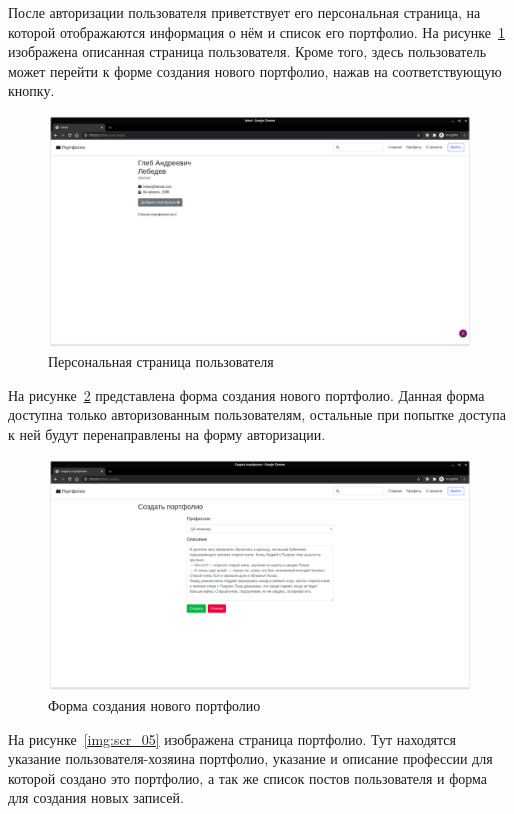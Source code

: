 После авторизации пользователя приветствует его персональная страница, на которой отображаются информация о нём и список его портфолио. На рисунке~\ref{img:scr_03} изображена описанная страница пользователя. Кроме того, здесь пользователь может перейти к форме создания нового портфолио, нажав на соответствующую кнопку.

\begin{figure}[H]
    \centering
    \includegraphics[scale=0.235]{images/scr_03.png}
    \caption{Персональная страница пользователя}\label{img:scr_03}
\end{figure}

На рисунке~\ref{img:scr_04} представлена форма создания нового портфолио. Данная форма доступна только авторизованным пользователям, остальные при попытке доступа к ней будут перенаправлены на форму авторизации.

\begin{figure}[H]
    \centering
    \includegraphics[scale=0.235]{images/scr_04.png}
    \caption{Форма создания нового портфолио}\label{img:scr_04}
\end{figure}

На рисунке~\ref{img:scr_05} изображена страница портфолио. Тут находятся указание пользователя-хозяина портфолио, указание и описание профессии для которой создано это портфолио, а так же список постов пользователя и форма для создания новых записей.

